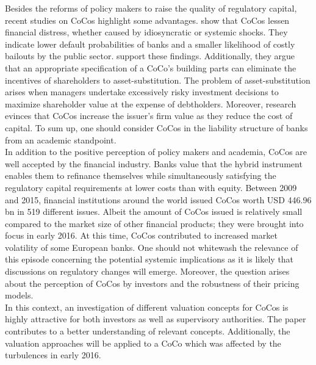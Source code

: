 Besides the reforms of policy makers to raise the quality of regulatory capital, recent studies on CoCos highlight some advantages. \citet{albul2015contingent} show that CoCos lessen financial distress, whether caused by idiosyncratic or systemic shocks. They indicate lower default probabilities of banks and a smaller likelihood of costly bailouts by the public sector. \citet{hilscher2014bank} support these findings. Additionally, they argue that an appropriate specification of a CoCo's building parts can eliminate the incentives of shareholders to asset-substitution. The problem of asset-substitution arises when managers undertake excessively risky investment decisions to maximize shareholder value at the expense of debtholders. \citep{bannier2010} Moreover, research evinces that CoCos increase the issuer's firm value as they reduce the cost of capital. \citep{albul2015contingent, von2011contingent, barucci2012countercyclical} To sum up, one should consider CoCos in the liability structure of banks from an academic standpoint.\\ 

In addition to the positive perception of policy makers and academia, CoCos are well accepted by the financial industry. Banks value that the hybrid instrument enables them to refinance themselves while simultaneously satisfying the regulatory capital requirements at lower costs than with equity. \citep{europeanparliament2016} Between 2009 and 2015, financial institutions around the world issued CoCos worth USD 446.96 bn in 519 different issues. \citep{avdjiev2015coco} Albeit the amount of CoCos issued is relatively small compared to the market size of other financial products; they were brought into focus in early 2016. At this time, CoCos contributed to increased market volatility of some European banks. 
One should not whitewash the relevance of this episode concerning the potential systemic implications as it is likely that discussions on regulatory changes will emerge.  Moreover, the question arises about the perception of CoCos by investors and the robustness of their pricing models. \citep{europeanparliament2016} \\

In this context, an investigation of different valuation concepts for CoCos is highly attractive for both investors as well as supervisory authorities. The paper contributes to a better understanding of relevant concepts. Additionally, the valuation approaches will be applied to a CoCo which was affected by the turbulences in early 2016.


